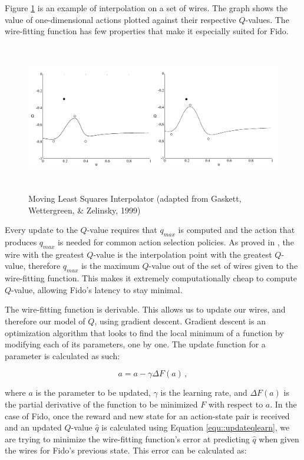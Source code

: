Figure \ref{fig::wirefitexample} is an example of interpolation on a set of wires.
The graph shows the value of one-dimensional actions plotted against their respective $Q$-values.
The wire-fitting function has few properties that make it especially suited for Fido.

\begin{figure}[ht]
   \centering
   \includegraphics[height=6.5cm]{Figures/WireFit.png}
	\caption{Moving Least Squares Interpolator (adapted from Gaskett, Wettergreen, \& Zelinsky, 1999)}
   \label{fig::wirefitexample}
\end{figure}

Every update to the $Q$-value requires that $q_{max}$ is computed and the action that produces $q_{max}$ is needed for common action selection policies.
As proved in \cite{baird}, the wire with the greatest $Q$-value is the interpolation point with the greatest $Q$-value, therefore $q_{max}$ is the maximum $Q$-value out of the set of wires given to the wire-fitting function.
This makes it extremely computationally cheap to compute $Q$-value, allowing Fido's latency to stay minimal.

The wire-fitting function is derivable.
This allows us to update our wires, and therefore our model of $Q$, using gradient descent.
Gradient descent is an optimization algorithm that looks to find the local minimum of a function by modifying each of its parameters, one by one.
The update function for a parameter is calculated as such:

\begin{equation}
	a = a - \gamma \Delta F(a)
	\,,
	\label{equ::wirefiterrorfunction}
\end{equation}

where $a$ is the parameter to be updated, $\gamma$ is the learning rate, and $\Delta F(a)$ is the partial derivative of the function to be minimized $F$ with respect to $a$.
In the case of Fido, once the reward and new state for an action-state pair is received and an updated $Q$-value $\hat{q}$ is calculated using Equation \ref{equ::updateqlearn}, we are trying to minimize the wire-fitting function's error at predicting $\hat{q}$ when given the wires for Fido's previous state.
This error can be calculated as:

